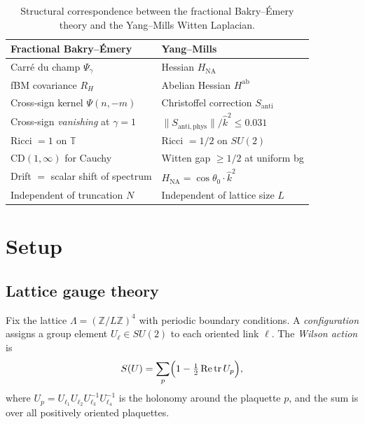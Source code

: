 \documentclass[11pt,a4paper]{article}
\theoremstyle{plain}
\theoremstyle{definition}
\theoremstyle{remark}
\newcommand{\Z}{\mathbb{Z}}
\newcommand{\T}{\mathbb{T}}
\newcommand{\tr}{\mathrm{tr}}
\newcommand{\khat}{\hat{k}}
\begin{document}
\begin{table}[h]
\centering
\caption{Structural correspondence between the fractional
Bakry--\'Emery theory and the Yang--Mills Witten Laplacian.}
\label{tab:correspondence}
\begin{tabular}{@{}ll@{}}
\toprule
\textbf{Fractional Bakry--\'Emery} & \textbf{Yang--Mills} \\
\midrule
Carr\'e du champ $\Psi_\gamma$ & Hessian $H_{\mathrm{NA}}$ \\
fBM covariance $R_H$ & Abelian Hessian $H^{\mathrm{ab}}$ \\
Cross-sign kernel $\Psi(n,-m)$ & Christoffel correction $S_{\mathrm{anti}}$ \\
Cross-sign \emph{vanishing} at $\gamma = 1$ &
  $\|S_{\mathrm{anti,phys}}\|/\khat^2 \leq 0.031$ \\
Ricci $= 1$ on $\T$ & Ricci $= 1/2$ on $SU(2)$ \\
$\mathrm{CD}(1, \infty)$ for Cauchy & Witten gap $\geq 1/2$ at uniform bg \\
Drift $=$ scalar shift of spectrum & $H_{\mathrm{NA}} = \cos\theta_0 \cdot \khat^2$ \\
Independent of truncation $N$ & Independent of lattice size $L$ \\
\bottomrule
\end{tabular}
\end{table}


\section{Setup}\label{sec:setup}

\subsection{Lattice gauge theory}

Fix the lattice $\Lambda = (\Z/L\Z)^4$ with periodic boundary
conditions.
A \emph{configuration} assigns a group element $U_\ell \in SU(2)$
to each oriented link $\ell$.
The \emph{Wilson action} is
\begin{equation}\label{eq:wilson}
  S(U) = \sum_p \Bigl(1 - \tfrac{1}{2}\,\mathrm{Re}\,\tr\, U_p\Bigr),
\end{equation}
where $U_p = U_{\ell_1} U_{\ell_2} U_{\ell_3}^{-1} U_{\ell_4}^{-1}$
is the holonomy around the plaquette $p$, and the sum is over all
positively oriented plaquettes.
\end{document}
